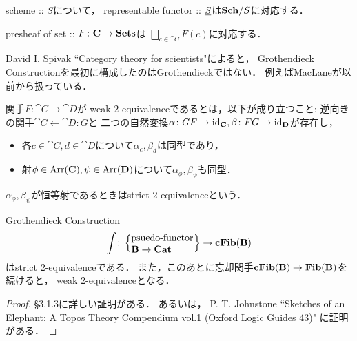 \documentclass[a4paper, dvipdfmx]{jsarticle}
\begin{document}
    \begin{Example}
        scheme :: $S$について，
        representable functor :: $\ftor{S}$は$\Sch/S$に対応する．
    \end{Example}

    \begin{Example}
        presheaf of set :: $F \colon \cat{C} \to \Sets$は
        $\bigsqcup_{c \in \cat{C}} F(c)$に対応する．
    \end{Example}

    \begin{Remark}
        David I. Spivak ``Category theory for scientists"によると，
        Grothendieck Constructionを最初に構成したのはGrothendieckではない．
        例えばMacLaneが以前から扱っている．
    \end{Remark}

    \begin{Def}
        関手$F \colon \cat{C} \rightarrow \cat{D}$が
        weak $2$-equivalenceであるとは，以下が成り立つこと:
        逆向きの関手$\cat{C} \leftarrow \cat{D} \colon G$と
        二つの自然変換$\alpha \colon GF \to \id[\cat{C}], \beta \colon FG \to \id[\cat{D}]$が存在し，
        \begin{itemize}
            \item 各$c \in \cat{C}, d \in \cat{D}$について$\alpha_{c}, \beta_{d}$は同型であり，
            \item 射$\phi \in \Arr(\cat{C}), \psi \in \Arr(\cat{D})$について$\alpha_{\phi}, \beta_{\psi}$も同型．
        \end{itemize}
        $\alpha_{\phi}, \beta_{\psi}$が恒等射であるときはstrict $2$-equivalenceという．
    \end{Def}

    \begin{Thm}
        Grothendieck Construction
        \[
            \int \colon
            \left\{ \parbox{2.3cm}{psuedo-functor \\ \quad \ $\cat{B} \to \Cat$} \right\} \to \cFib{B}
        \]
        はstrict $2$-equivalenceである．
        また，このあとに忘却関手$\cFib{B} \to \Fib{B}$を続けると，
        weak $2$-equivalenceとなる．
    \end{Thm}
    \begin{proof}
        \cite{NoteGroTop} \S 3.1.3に詳しい証明がある．
        あるいは，
        P. T. Johnstone
            ``Sketches of an Elephant: A Topos Theory Compendium vol.1 (Oxford Logic Guides 43)"
        に証明がある．
    \end{proof}
    
\end{document}
